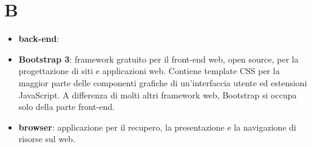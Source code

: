 \section{B}
\begin{itemize} 
	\item \textbf{back-end}:
	\item \textbf{Bootstrap 3}: framework gratuito per il front-end web, open source, per la progettazione di siti e applicazioni web. Contiene template CSS per la maggior parte delle componenti grafiche di un'interfaccia utente ed estensioni JavaScript. A differenza di molti altri framework web, Bootstrap si occupa solo della parte front-end.
	\item \textbf{browser}: applicazione per il recupero, la presentazione e la navigazione di risorse sul web.
\end{itemize}